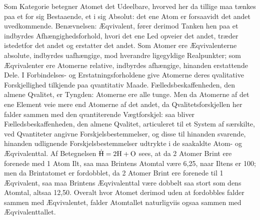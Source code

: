 \documentclass[12pt,a4paper]{book}
\begin{document}
Som Kategorie betegner Atomet det Udeelbare, hvorved
her da tillige maa tænkes paa et for sig Bestaaende, et i sig
Absolut: det ene Atom er forsaavidt det andet uvedkommende.
Benævnelsen: Æqvivalent, fører derimod Tanken hen paa et
indbyrdes Afhængighedsforhold, hvori det ene Led opveier det
andet, træder istedetfor det andet og erstatter det andet.
Som Atomer ere Æqvivalenterne absolute, indbyrdes uafhængige,
mod hverandre ligegyldige Realpunkter; som Æqvivalenter
ere Atomerne relative, indbyrdes afhængige, hinanden
erstattende Dele. I Forbindelses- og Erstatningsforholdene
give Atomerne deres qvalitative Forskjellighed tilkjende paa
qvantitativ Maade. Fælledsbeskaffenheden, den almene Qvalitet,
er Tyngden: Atomerne ere alle tunge. Men da Atomerne
af det ene Element veie mere end Atomerne af det andet,
da Qvalitetsforskjellen her falder sammen med den qvantiterende
Vægtforskjel: saa bliver Fælledsbeskaffenheden, den
almene Qvalitet, articuleret til et System af særskilte, ved
Qvantiteter angivne Forskjelsbestemmelser, og disse til hinanden
svarende, hinanden udlignende Forskjelsbestemmelser udtrykte
i de saakaldte Atom- og Æqvivalenttal. Af Betegnelsen
$\dot{\rlap{\rule[0.8ex]{0.75em}{0.4pt}}\mathrm{H}} =
2\mathrm{H} + \mathrm{O}$ sees, at da 2 Atomer Brint ere forenede med
1 Atom Ilt, saa maa Brintens Atomtal være 6,25, naar
Iltens er 100; men da Brintatomet er fordobblet, da 2
Atomer Brint ere forenede til 1 Æqvivalent, saa maa Brintens
Æqvivalenttal være dobbelt saa stort som dens Atomtal, altsaa
12,50. Overalt hvor Atomet derimod uden at fordobbles
falder sammen med Æqvivalentet, falder Atomtallet naturligviis
ogsaa sammen med Æqvivalenttallet.
\end{document}
